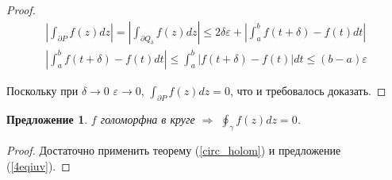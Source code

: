 \documentclass[12pt]{article}
\newcommand{\Ra}{\Rightarrow}
\newcounter{cnt}
\theoremstyle{thmnote}
\newtheorem{proposition}[cnt]{Предложение}
\theoremstyle{remark}
\theoremstyle{defnote}
\begin{document}
\begin{proof}
    \begin{gather*}
        \left| \int_{\partial P} f(z)dz \right| = \left| \int_{\partial Q_{\delta}} f(z)dz \right| \leq 2 \delta \varepsilon + \left| \int_a^b f(t + \delta) - f(t) dt \right| \\
        \left| \int_a^b f(t + \delta) - f(t) dt \right| \leq \int_a^b |f(t + \delta) - f(t)| dt \leq (b - a) \varepsilon
    \end{gather*}

    Поскольку при $\delta \to 0$ $\varepsilon \to 0$, $\int_{\partial P} f(z)dz = 0$, что и требовалось доказать.
\end{proof}

\begin{proposition}
    $f$ голоморфна в круге $\Ra$ $\oint_{\gamma} f(z)dz = 0$.
\end{proposition}
\begin{proof}
    Достаточно применить теорему (\ref{circ_holom}) и предложение (\ref{4eqiuv}).
\end{proof}
\end{document}
